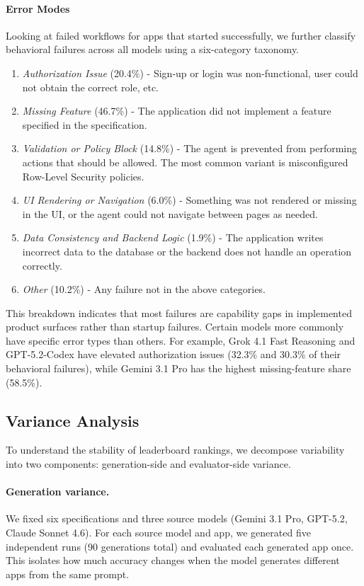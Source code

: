 \paragraph{Error Modes} Looking at failed workflows for apps that started successfully, we further classify behavioral failures across all models using a six-category taxonomy.
\begin{enumerate}
\item \textit{Authorization Issue} (20.4\%) - Sign-up or login was non-functional, user could not obtain the correct role, etc.
\item \textit{Missing Feature} (46.7\%) - The application did not implement a feature specified in the specification.
\item  \textit{Validation or Policy Block} (14.8\%) - The agent is prevented from performing actions that should be allowed. The most common variant is misconfigured Row-Level Security policies.
\item\textit{UI Rendering or Navigation} (6.0\%) - Something was not rendered or missing in the UI, or the agent could not navigate between pages as needed.
\item \textit{Data Consistency and Backend Logic} (1.9\%) - The application writes incorrect data to the database or the backend does not handle an operation correctly.
\item \textit{Other} (10.2\%) - Any failure not in the above categories.
\end{enumerate}
This breakdown indicates that most failures are capability gaps in implemented product surfaces rather than startup failures. Certain models more commonly have specific error types than others. For example, Grok 4.1 Fast Reasoning and GPT-5.2-Codex have elevated authorization issues (32.3\% and 30.3\% of their behavioral failures), while Gemini 3.1 Pro has the highest missing-feature share (58.5\%).

\subsection{Variance Analysis}

To understand the stability of leaderboard rankings, we decompose variability into two components: generation-side and evaluator-side variance.

\paragraph{Generation variance.}
We fixed six specifications and three source models (Gemini 3.1 Pro, GPT-5.2, Claude Sonnet 4.6). For each source model and app, we generated five independent runs (90 generations total) and evaluated each generated app once. This isolates how much accuracy changes when the model generates different apps from the same prompt.


